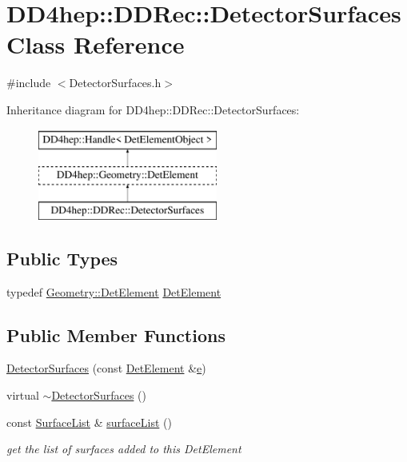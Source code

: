 \hypertarget{class_d_d4hep_1_1_d_d_rec_1_1_detector_surfaces}{}\section{D\+D4hep\+:\+:D\+D\+Rec\+:\+:Detector\+Surfaces Class Reference}
\label{class_d_d4hep_1_1_d_d_rec_1_1_detector_surfaces}


{\ttfamily \#include $<$Detector\+Surfaces.\+h$>$}

Inheritance diagram for D\+D4hep\+:\+:D\+D\+Rec\+:\+:Detector\+Surfaces\+:\begin{figure}[H]
\begin{center}
\leavevmode
\includegraphics[height=3.000000cm]{class_d_d4hep_1_1_d_d_rec_1_1_detector_surfaces}
\end{center}
\end{figure}
\subsection*{Public Types}
\begin{DoxyCompactItemize}
\item 
typedef \hyperlink{class_d_d4hep_1_1_geometry_1_1_det_element}{Geometry\+::\+Det\+Element} \hyperlink{class_d_d4hep_1_1_d_d_rec_1_1_detector_surfaces_a1b81ef076a40865045f404fb3e360562}{Det\+Element}
\end{DoxyCompactItemize}
\subsection*{Public Member Functions}
\begin{DoxyCompactItemize}
\item 
\hyperlink{class_d_d4hep_1_1_d_d_rec_1_1_detector_surfaces_a58d3e7043a5f76b37f9cf042f79b2cc1}{Detector\+Surfaces} (const \hyperlink{class_d_d4hep_1_1_d_d_rec_1_1_detector_surfaces_a1b81ef076a40865045f404fb3e360562}{Det\+Element} \&\hyperlink{_volumes_8cpp_a8a9a1f93e9b09afccaec215310e64142}{e})
\item 
virtual \hyperlink{class_d_d4hep_1_1_d_d_rec_1_1_detector_surfaces_aa0ef16856472dab841a659a97386acd0}{$\sim$\+Detector\+Surfaces} ()
\item 
const \hyperlink{class_d_d4hep_1_1_d_d_rec_1_1_surface_list}{Surface\+List} \& \hyperlink{class_d_d4hep_1_1_d_d_rec_1_1_detector_surfaces_a61d2f33c2a7e0ade6737de05e7e795f1}{surface\+List} ()
\begin{DoxyCompactList}\small\item\em get the list of surfaces added to this Det\+Element \end{DoxyCompactList}\end{DoxyCompactItemize}
